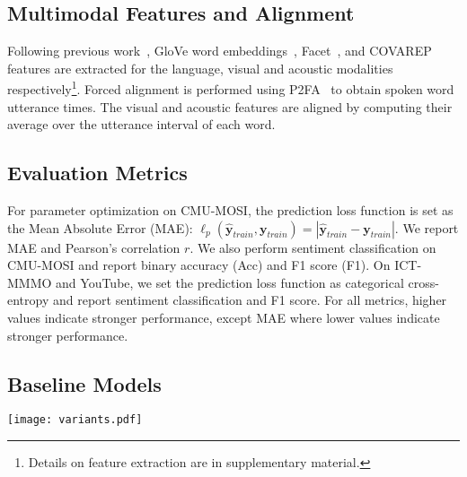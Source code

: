 \documentclass[letterpaper]{article} %
\newcommand{\citep}{\cite}
\newcommand{\ours}{MCTN}
\begin{document}
\subsection{Multimodal Features and Alignment}
Following previous work~\citep{multistage}, GloVe word embeddings~\citep{pennington2014glove}, Facet~\citep{emotient}, and COVAREP~\citep{degottex2014covarep} features are extracted for the language, visual and acoustic modalities respectively\footnote{Details on feature extraction are in supplementary material.}. Forced alignment is performed using P2FA~\citep{P2FA} to obtain spoken word utterance times. The visual and acoustic features are aligned by computing their average over the utterance interval of each word.

\subsection{Evaluation Metrics}
For parameter optimization on CMU-MOSI, the prediction loss function is set as the Mean Absolute Error (MAE): $\ell_p (\hat{\mathbf{y}}_{train},\mathbf{y}_{train}) = |\hat{\mathbf{y}}_{train}-\mathbf{y}_{train}|$. We report MAE and Pearson's correlation $r$. We also perform sentiment classification on CMU-MOSI and report binary accuracy (Acc) and F1 score (F1). On ICT-MMMO and YouTube, we set the prediction loss function as categorical cross-entropy and report sentiment classification and F1 score. For all metrics, higher values indicate stronger performance, except MAE where lower values indicate stronger performance. 

\subsection{Baseline Models}
\label{sec:base}

\begin{figure*}[ht]
\centering
\texttt{[image: variants.pdf]}
\caption{
\small
{Variations of our models: 
(a) \ours \ Bimodal with cyclic translation, 
(b) Simple Bimodal without cyclic translation, 
(c) No-Cycle Bimodal with different inputs of the same modality pair, and without cyclic translation, 
(d) Double Bimodal for two modalities without cyclic translation, with two different inputs (of the same pair), 
(e) \ours \ Trimodal with input from (a),
(f) Simple Trimodal for three modalities, with input as a joint representation taken from previous \ours \ for two modalities from (b) or (c), 
(g) Double Trimodal with input from (d), 
(h) Concat Trimodal which is similar to (b) but with input as the concatenation of 2 modalities, 
(i) Paired Trimodal using one encoder and 2 separate decoders for modality translations.
\textit{Legend}: black modality is ground truth, red (``hat'') modality represents translated output, blue (``hat'') modality is target output from previous translation outputs, and yellow box denotes concatenation.}
}
\label{fig:variants}
\end{figure*}
\addtocounter{figure}{-1}
\end{document}
